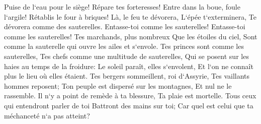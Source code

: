 \verse Puise de l`eau pour le siège! Répare tes forteresses! Entre dans la boue, foule l`argile! Rétablis le four à briques! 
\verse Là, le feu te dévorera, L`épée t`exterminera, Te dévorera comme des sauterelles. Entasse-toi comme les sauterelles! Entasse-toi comme les sauterelles! 
\verse Tes marchands, plus nombreux Que les étoiles du ciel, Sont comme la sauterelle qui ouvre les ailes et s`envole. 
\verse Tes princes sont comme les sauterelles, Tes chefs comme une multitude de sauterelles, Qui se posent sur les haies au temps de la froidure: Le soleil paraît, elles s`envolent, Et l`on ne connaît plus le lieu où elles étaient. 
\verse Tes bergers sommeillent, roi d`Assyrie, Tes vaillants hommes reposent; Ton peuple est dispersé sur les montagnes, Et nul ne le rassemble. 
\verse Il n`y a point de remède à ta blessure, Ta plaie est mortelle. Tous ceux qui entendront parler de toi Battront des mains sur toi; Car quel est celui que ta méchanceté n`a pas atteint? 
